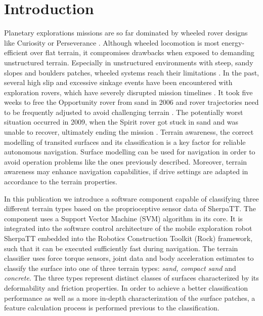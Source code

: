 \section{Introduction}

Planetary explorations missions are so far dominated by wheeled rover designs like Curiosity
or Perseverance \citep{moeller2021, welch2013}. Although wheeled locomotion is most energy-efficient
over flat terrain, it compromises drawbacks when exposed to demanding unstructured
terrain. Especially in unstructured environments with steep, sandy slopes and boulders
patches, wheeled systems reach their limitations \citep{kolvenbach2021}. In the past, several high slip and
excessive sinkage events have been encountered with exploration rovers, which have severely
disrupted mission timelines \citep{gonzalez2018}. It took five weeks to free the Opportunity
rover from sand in 2006 \citep{young2006} and rover trajectories need to be frequently adjusted to avoid
challenging terrain \citep{arvidson2017}. The potentially worst situation occurred in 2009, when the
Spirit rover got stuck in sand and was unable to recover, ultimately ending the mission
\citep{webster2009}. 
Terrain awareness, the correct modelling of transited surfaces and its classification is a key factor for reliable autonomous navigation. 
Surface modelling can be used for navigation in order to avoid operation problems like the ones previously described. 
Moreover, terrain awareness may enhance navigation capabilities, if drive settings are adapted in accordance to the 
terrain properties.

In this publication we introduce a software component capable of classifying three different terrain types based on the proprioceptive sensor data of SherpaTT. 
The component uses a Support Vector Machine (SVM) algorithm \citep{vapnik1992,cristianini2000} in its core. It is integrated into the software control architecture of the mobile exploration robot SherpaTT embedded into the Robotics Construction Toolkit (Rock) framework, such that it can be executed sufficiently fast during navigation. The terrain classifier uses force torque sensors, joint data and body acceleration estimates to classify the surface into one of three terrain types: \emph{sand, compact sand} and \emph{concrete}.
The three types represent distinct classes of surfaces characterized by its deformability and friction properties. In order to achieve a better classification performance as well as a more in-depth characterization of the surface patches, a feature calculation process is performed previous to the classification. 

